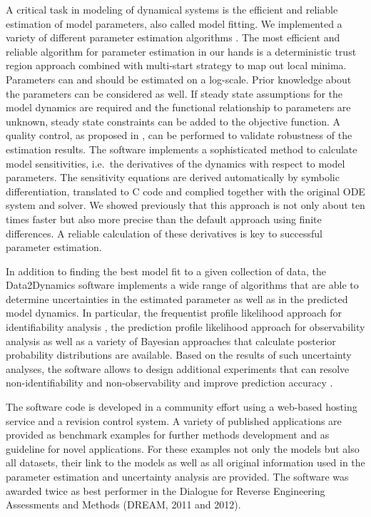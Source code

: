 \documentclass{bioinfo}
\begin{document}
A critical task in modeling of dynamical systems is the efficient and reliable estimation of 
model parameters, also called model fitting. We implemented a variety of different 
parameter estimation algorithms \citep{Raue:2012zt}. The most efficient and reliable 
algorithm for parameter estimation in our hands is a deterministic trust region approach 
combined with multi-start strategy to map out local minima. Parameters can and should 
be estimated on a log-scale. Prior knowledge about the parameters can be considered as 
well. If steady state assumptions for the model dynamics are required and the functional 
relationship to parameters are unknown, steady state constraints can be added to the 
objective function. A quality control, as proposed in 
\citet{Raue:2012zt}, can be performed to validate robustness of the estimation results. The 
software implements a sophisticated method to calculate model sensitivities, i.e.~the 
derivatives of the dynamics with respect to model parameters. The sensitivity equations 
are derived automatically by symbolic differentiation, translated to C code and complied 
together with the original ODE system and solver. We showed previously 
\citep{Raue:2012zt} that this approach is not only about ten times faster but also more 
precise than the default approach using finite differences. A reliable calculation of these 
derivatives is key to successful parameter estimation. 

In addition to finding the best model fit to a given collection of data, the Data2Dynamics 
software implements a wide range of algorithms that are able to determine uncertainties 
in the estimated parameter as well as in the predicted model dynamics. In particular, the 
frequentist profile likelihood approach for identifiability analysis \citep{Raue:2009ec}, the 
prediction profile likelihood approach for observability analysis \citep{Kreutz:2011kx} as 
well as a variety of Bayesian approaches \citep{Raue:2013fk, Hug:2012fk} that calculate 
posterior probability distributions are available. Based on the results of such uncertainty 
analyses, the software allows to design additional experiments \citep{Steiert:2012fk} that 
can resolve non-identifiability and non-observability \citep{Raue:2010fk} 
and improve prediction accuracy \citep{Kreutz:2013uq}.

The software code is developed in a community effort using a web-based hosting service 
and a revision control system. A variety of published applications are provided as benchmark examples for further methods development and as guideline for novel applications. For these examples not only the models but also all datasets, their link to the models as well as all original information used in the parameter estimation and uncertainty analysis are provided. The software was awarded twice as best performer in the Dialogue for Reverse Engineering Assessments and Methods (DREAM, 2011 and 2012).
\end{document}
